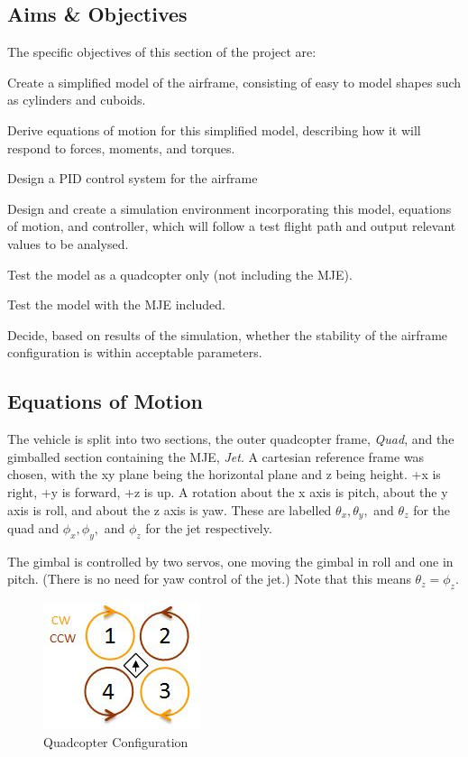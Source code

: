\documentclass[11pt]{article}
\begin{document}
\subsection{Aims \& Objectives} \label{simulation objectives}
The specific objectives of this section of the project are:
\begin{compactenum}
    \item Create a simplified model of the airframe, consisting of easy to model shapes such as cylinders and cuboids.
    \item Derive equations of motion for this simplified model, describing how it will respond to forces, moments, and torques.
    \item Design a PID control system for the airframe
    \item Design and create a simulation environment incorporating this model, equations of motion, and controller, which will follow a test flight path and output relevant values to be analysed.
    \item Test the model as a quadcopter only (not including the MJE).
    \item Test the model with the MJE included.
    \item Decide, based on results of the simulation, whether the stability of the airframe configuration is within acceptable parameters.
\end{compactenum}

\subsection{Equations of Motion}
The vehicle is split into two sections, the outer quadcopter frame, \emph{Quad}, and the gimballed section containing the MJE, \emph{Jet}. A cartesian reference frame was chosen, with the xy plane being the horizontal plane and z being height. +x is right, +y is forward, +z is up. A rotation about the x axis is pitch, about the y axis is roll, and about the z axis is yaw. These are labelled $\theta_x, \theta_y,$ and $\theta_z$ for the quad and $\phi_x, \phi_y,$ and $\phi_z$ for the jet respectively.

The gimbal is controlled by two servos, one moving the gimbal in roll and one in pitch. (There is no need for yaw control of the jet.)  Note that this means $\theta_z = \phi_z$.

\begin{figure}
    \begin{center}
        \includegraphics[width=0.48\linewidth]{Quad-X}
        \caption{Quadcopter Configuration}
        \label{fig:quad-x}
    \end{center}
\end{figure}
\end{document}
